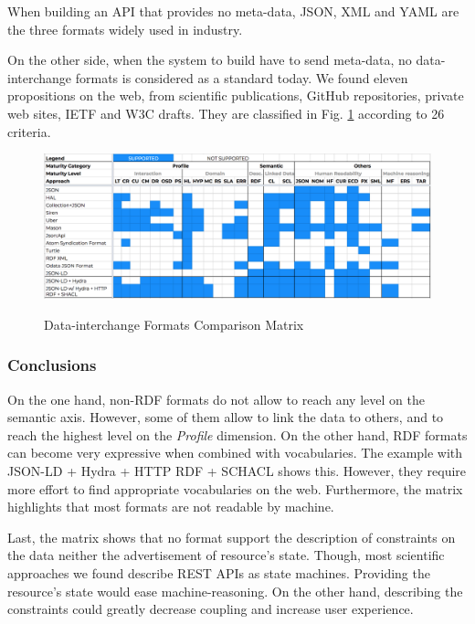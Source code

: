 When building an API that provides no meta-data, JSON, XML and YAML are the three formats widely used in industry.

On the other side, when the system to build have to send meta-data, no data-interchange formats is considered as a standard today. We found eleven propositions on the web, from scientific publications, GitHub repositories, private web sites, IETF and W3C drafts. They are classified in Fig. \ref{interchange-formats-matrix} according to 26 criteria.

\begin{figure}[t]
\caption{Data-interchange Formats Comparison Matrix}
\includegraphics[width=1\textwidth]{figures/DIF.png}
\label{interchange-formats-matrix}
\end{figure}

\subsubsection*{Conclusions}

On the one hand, non-RDF formats do not allow to reach any level on the semantic axis. However, some of them allow to link the data to others, and to reach the highest level on the \textit{Profile} dimension.
On the other hand, RDF formats can become very expressive when combined with vocabularies. The example with JSON-LD + Hydra + HTTP RDF + SCHACL shows this. However, they require more effort to find appropriate vocabularies on the web.
Furthermore, the matrix highlights that most formats are not readable by machine.

Last, the matrix shows that no format support the description of constraints on the data neither the advertisement of resource's state. Though, most scientific approaches we found describe REST APIs as state machines. Providing the resource's state would ease machine-reasoning. On the other hand, describing the constraints could greatly decrease coupling and increase user experience.

